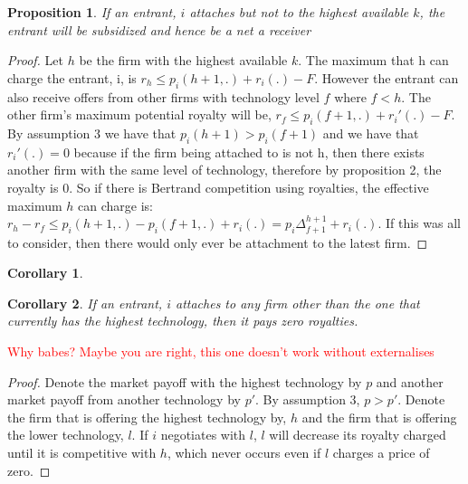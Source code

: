 \documentclass{article}
\newtheorem{corollary}{Corollary}
\newtheorem{proposition}{Proposition}
\begin{document}
\begin{proposition}
If an entrant, $i$ attaches but not to the highest available $k$, the entrant will be subsidized and hence be a \textit{net a receiver}
\end{proposition}

\begin{proof}
Let $h$ be the firm with the highest available $k$. The maximum that h can charge the entrant, i, is $r_h \leq p_i(h+1,.)+r_i(.)-F$. However the entrant can also receive offers from other firms with technology level $f$ where $f < h$. The other firm's maximum potential royalty will be, $r_f \leq p_i(f+1,.)+r_i'(.)-F$. By assumption 3 we have that $p_i(h+1)>p_i(f+1)$ and we have that $r_i'(.)=0$ because if the firm being attached to is not h, then there exists another firm with the same level of technology, therefore by proposition 2, the royalty is 0. So if there is Bertrand competition using royalties, the effective maximum $h$ can charge is: $r_h-r_f \leq p_i(h+1,.)-p_i(f+1,.)+r_i(.)= p_i\Delta_{f+1}^{h+1} +r_i(.) $. If this was all to consider, then there would only ever be attachment to the latest firm. 
\end{proof}

\begin{corollary}
\end{corollary}

\begin{corollary}
If an entrant, $i$ attaches to any firm other than the one that currently has the highest technology, then it pays zero royalties. 
\end{corollary}
\textcolor{red}{Why babes? Maybe you are right, this one doesn't work without externalises}
\begin{proof}
Denote the market payoff with the highest technology by $p$ and another market payoff from another technology by $p'$. By assumption 3, $p>p'$. Denote the firm that is offering the highest technology by, $h$ and the firm that is offering the lower technology, $l$. If $i$ negotiates with $l$, $l$ will decrease its royalty charged until it is competitive with $h$, which never occurs even if $l$ charges a price of zero. 
\end{proof}
\end{document}
